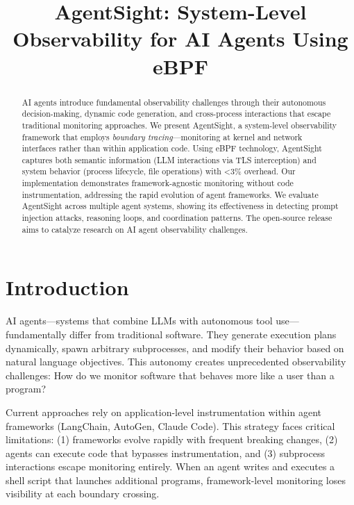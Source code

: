 \documentclass[sigplan,screen，review,9pt]{acmart}
\begin{document}
\title{AgentSight: System-Level Observability for AI Agents Using eBPF}


\author{}


\sloppy
\begin{abstract}
AI agents introduce fundamental observability challenges through their autonomous decision-making, dynamic code generation, and cross-process interactions that escape traditional monitoring approaches. We present AgentSight, a system-level observability framework that employs \emph{boundary tracing}—monitoring at kernel and network interfaces rather than within application code. Using eBPF technology, AgentSight captures both semantic information (LLM interactions via TLS interception) and system behavior (process lifecycle, file operations) with <3\% overhead. Our implementation demonstrates framework-agnostic monitoring without code instrumentation, addressing the rapid evolution of agent frameworks. We evaluate AgentSight across multiple agent systems, showing its effectiveness in detecting prompt injection attacks, reasoning loops, and coordination patterns. The open-source release aims to catalyze research on AI agent observability challenges.
\end{abstract}


\maketitle



\section{Introduction}

AI agents—systems that combine LLMs with autonomous tool use—fundamentally differ from traditional software. They generate execution plans dynamically, spawn arbitrary subprocesses, and modify their behavior based on natural language objectives. This autonomy creates unprecedented observability challenges: How do we monitor software that behaves more like a user than a program?

Current approaches rely on application-level instrumentation within agent frameworks (LangChain, AutoGen, Claude Code). This strategy faces critical limitations: (1) frameworks evolve rapidly with frequent breaking changes, (2) agents can execute code that bypasses instrumentation, and (3) subprocess interactions escape monitoring entirely. When an agent writes and executes a shell script that launches additional programs, framework-level monitoring loses visibility at each boundary crossing.
\end{document}
